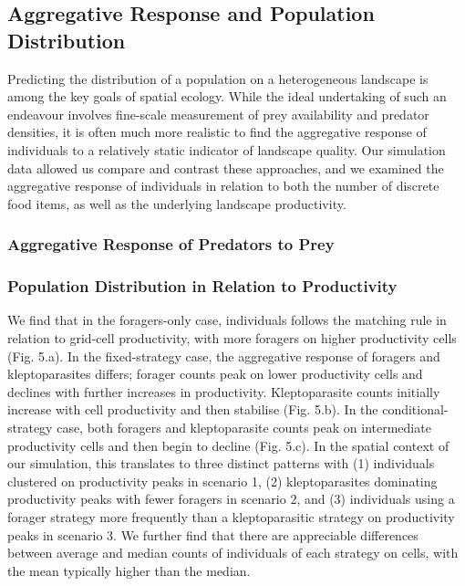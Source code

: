 \documentclass[11pt]{article}
\begin{document}
\subsection{Aggregative Response and Population Distribution}

Predicting the distribution of a population on a heterogeneous landscape is among the key goals of spatial ecology.
While the ideal undertaking of such an endeavour involves fine-scale measurement of prey availability and predator densities, it is often much more realistic to find the aggregative response of individuals to a relatively static indicator of landscape quality.
Our simulation data allowed us compare and contrast these approaches, and we examined the aggregative response of individuals in relation to both the number of discrete food items, as well as the underlying landscape productivity.

\subsubsection{Aggregative Response of Predators to Prey}

\subsubsection{Population Distribution in Relation to Productivity}

We find that in the foragers-only case, individuals follows the matching rule in relation to grid-cell productivity, with more foragers on higher productivity cells (Fig. 5.a).
In the fixed-strategy case, the aggregative response of foragers and kleptoparasites differs; forager counts peak on lower productivity cells and declines with further increases in productivity.
Kleptoparasite counts initially increase with cell productivity and then stabilise (Fig. 5.b).
In the conditional-strategy case, both foragers and kleptoparasite counts peak on intermediate productivity cells and then begin to decline (Fig. 5.c).
In the spatial context of our simulation, this translates to three distinct patterns with (1) individuals clustered on productivity peaks in scenario 1, (2) kleptoparasites dominating productivity peaks with fewer foragers in scenario 2, and (3) individuals using a forager strategy more frequently than a kleptoparasitic strategy on productivity peaks in scenario 3.
We further find that there are appreciable differences between average and median counts of individuals of each strategy on cells, with the mean typically higher than the median.
\end{document}
